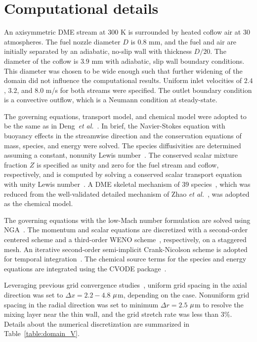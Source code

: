 \documentclass[review,3p,times]{elsarticle}
\begin{document}
\section{Computational details} \label{sec:computation}

An axisymmetric DME stream at $300$ K is surrounded by heated coflow air at $30$ atmospheres.  The fuel nozzle diameter $D$ is $0.8$ mm, and the fuel and air are initially separated by an adiabatic, no-slip wall with thickness $D/20$.  The diameter of the coflow is $3.9$ mm with adiabatic, slip wall boundary conditions.  This diameter was chosen to be wide enough such that further widening of the domain did not influence the computational results.  Uniform inlet velocities of $2.4$, $3.2$, and $8.0$ m/s for both streams were specified.  The outlet boundary condition is a convective outflow, which is a Neumann condition at steady-state.

The governing equations, transport model, and chemical model were adopted to be the same as in Deng~\emph{et al.}~\cite{deng15}.  In brief, the Navier-Stokes equation with buoyancy effects in the streamwise direction and the conservation equations of mass, species, and energy were solved.  The species diffusivities are determined assuming a constant, nonunity Lewis number~\cite{deng15}.  The conserved scalar mixture fraction $Z$ is specified as unity and zero for the fuel stream and coflow, respectively, and is computed by solving a conserved scalar transport equation with unity Lewis number~\cite{pitsch98b}.  A DME skeletal mechanism of $39$ species~\cite{bhagatwala15}, which was reduced from the well-validated detailed mechanism of Zhao \emph{et al.}~\cite{zhao08}, was adopted as the chemical model.

The governing equations with the low-Mach number formulation are solved using NGA~\cite{desjardins08}.  The momentum and scalar equations are discretized with a second-order centered scheme and a third-order WENO scheme~\cite{liu94}, respectively, on a staggered mesh.  An iterative second-order semi-implicit Crank-Nicolson scheme is adopted for temporal integration~\cite{pierce01}.  The chemical source terms for the species and energy equations are integrated using the CVODE package~\cite{cohen96}.

Leveraging previous grid convergence studies~\cite{deng15}, uniform grid spacing in the axial direction was set to $\Delta x = 2.2-4.8$ ${\rm \mu}$m, depending on the case.  Nonuniform grid spacing in the radial direction was set to minimum $\Delta r = 2.5$ ${\rm \mu}$m to resolve the mixing layer near the thin wall, and the grid stretch rate was less than $3$\%.  Details about the numerical discretization are summarized in Table~\ref{table:domain_V}.      
\end{document}
